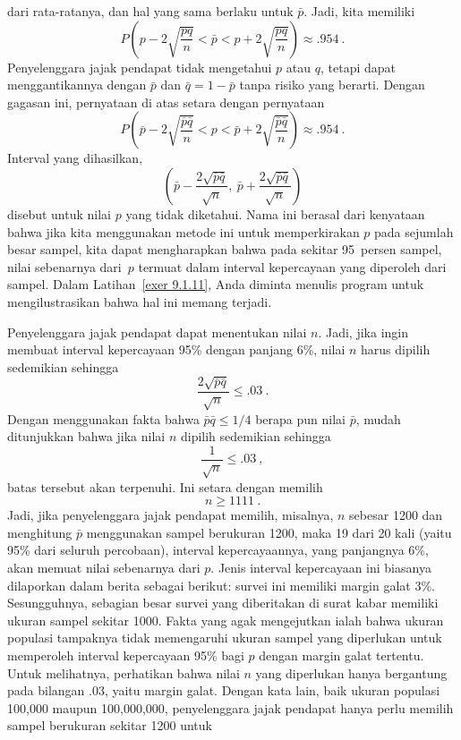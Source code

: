 \begin{example}
dari rata-ratanya, dan hal yang sama berlaku untuk $\bar p$.  Jadi, kita memiliki
$$P\left(p - 2\sqrt{\frac{pq}{n}} < \bar p < p + 2\sqrt{\frac{pq}{n}}\right) \approx .954\
.$$
Penyelenggara jajak pendapat tidak mengetahui $p$ atau $q$, tetapi dapat menggantikannya dengan $\bar p$ dan $\bar q = 1 -
\bar p$ tanpa risiko yang berarti.  Dengan gagasan ini, pernyataan di atas
setara dengan pernyataan
$$P\left(\bar p - 2\sqrt{\frac{\bar p \bar q}{n}} < p <
\bar p + 2\sqrt{\frac{\bar p \bar q}{n}}\right) \approx .954\ .$$
Interval yang dihasilkan,
$$
\left( \bar p - \frac {2\sqrt{\bar p \bar q}}{\sqrt n},\ 
\bar p + \frac {2\sqrt{\bar p \bar q}}{\sqrt n} \right)
$$
disebut  untuk nilai
$p$ yang tidak diketahui.  Nama ini berasal dari kenyataan bahwa jika kita menggunakan metode ini untuk
memperkirakan $p$ pada sejumlah besar sampel, kita dapat mengharapkan bahwa pada sekitar
95~persen sampel, nilai sebenarnya dari~$p$ termuat dalam interval kepercayaan
yang diperoleh dari sampel.  Dalam Latihan~\ref{exer 9.1.11}, Anda diminta
menulis program untuk mengilustrasikan bahwa hal ini memang terjadi.
\par
Penyelenggara jajak pendapat dapat menentukan nilai $n$.  Jadi, jika ingin membuat interval
kepercayaan 95\% dengan panjang 6\%, nilai $n$ harus dipilih sedemikian sehingga
$$\frac {2\sqrt{\bar p \bar q}}{\sqrt n} \le .03\ .$$
Dengan menggunakan fakta bahwa $\bar p \bar q \le 1/4$ berapa pun nilai $\bar p$,
mudah ditunjukkan bahwa jika nilai $n$ dipilih sedemikian sehingga
$$\frac{1}{\sqrt n} \le .03\ ,$$
batas tersebut akan terpenuhi.  Ini setara dengan memilih
$$n \ge 1111\ .$$
Jadi, jika penyelenggara jajak pendapat memilih, misalnya, $n$ sebesar 1200 dan menghitung $\bar p$ menggunakan
sampel berukuran 1200, maka 19 dari 20 kali (yaitu 95\% dari seluruh percobaan), interval kepercayaannya,
yang panjangnya 6\%, akan memuat nilai sebenarnya dari $p$.  Jenis interval kepercayaan ini
biasanya dilaporkan dalam berita sebagai berikut: survei ini memiliki margin galat 3\%.\index{margin
galat}  Sesungguhnya, sebagian besar survei yang diberitakan di surat kabar memiliki ukuran sampel
sekitar 1000.  Fakta yang agak mengejutkan ialah bahwa ukuran populasi tampaknya
tidak memengaruhi ukuran sampel yang diperlukan untuk memperoleh interval kepercayaan 95\% bagi $p$ dengan
margin galat tertentu.  Untuk melihatnya, perhatikan bahwa nilai $n$ yang diperlukan hanya bergantung pada
bilangan .03, yaitu margin galat.  Dengan kata lain, baik ukuran populasi
100{,}000 maupun 100{,}000{,}000, penyelenggara jajak pendapat hanya perlu memilih sampel berukuran sekitar 1200 untuk

\end{example}
